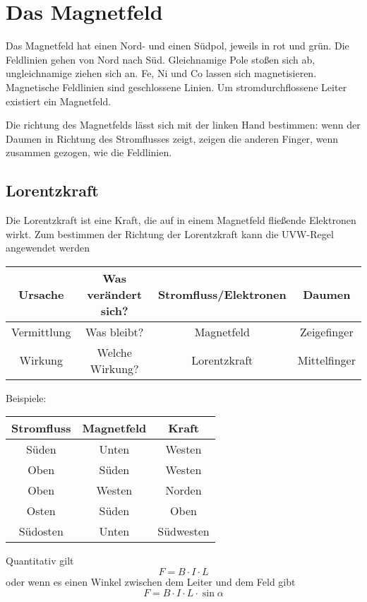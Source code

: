 \documentclass{article}\usepackage[a4paper]{geometry}
\begin{document}
\section{Das Magnetfeld}
Das Magnetfeld hat einen Nord- und einen Südpol, jeweils in rot und grün. Die Feldlinien gehen von Nord nach Süd.
Gleichnamige Pole stoßen sich ab, ungleichnamige ziehen sich an.
Fe, Ni und Co lassen sich magnetisieren.
Magnetische Feldlinien sind geschlossene Linien.
Um stromdurchflossene Leiter existiert ein Magnetfeld. 
 
Die richtung des Magnetfelds lässt sich mit der linken Hand bestimmen: wenn der Daumen in Richtung des Stromflusses zeigt, zeigen die anderen Finger, wenn zusammen gezogen, wie die Feldlinien. 
 
\subsection{Lorentzkraft}
Die Lorentzkraft ist eine Kraft, die auf in einem Magnetfeld fließende Elektronen wirkt. Zum bestimmen der Richtung der Lorentzkraft kann die UVW-Regel angewendet werden
\begin{center}
\begin{tabular}{ |c|c|c|c| }
\hline
 Ursache & Was verändert sich? & Stromfluss/Elektronen & Daumen \\
\hline
 Vermittlung & Was bleibt? & Magnetfeld & Zeigefinger \\
\hline
 Wirkung & Welche Wirkung? & Lorentzkraft & Mittelfinger \\
\hline
\end{tabular}
\end{center}
Beispiele:
\begin{center}
\begin{tabular}{ |c|c|c| }
\hline
 Stromfluss & Magnetfeld & Kraft \\
\hline
 Süden & Unten & Westen \\
 Oben & Süden & Westen \\
 Oben & Westen & Norden \\
 Osten & Süden & Oben \\
 Südosten & Unten & Südwesten \\
\hline
\end{tabular}
\end{center}
 
Quantitativ gilt
\[F=B \cdot I \cdot L\]
oder wenn es einen Winkel zwischen dem Leiter und dem Feld gibt
\[F=B \cdot I \cdot L \cdot \sin{\alpha}\]
 
\end{document}
